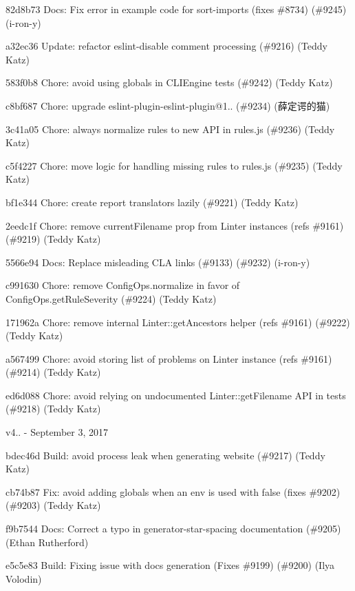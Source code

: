 \begin{DoxyItemize}
\item 82d8b73 Docs\+: Fix error in example code for sort-\/imports (fixes \#8734) (\#9245) (i-\/ron-\/y)
\item a32ec36 Update\+: refactor eslint-\/disable comment processing (\#9216) (Teddy Katz)
\item 583f0b8 Chore\+: avoid using globals in C\+L\+I\+Engine tests (\#9242) (Teddy Katz)
\item c8bf687 Chore\+: upgrade eslint-\/plugin-\/eslint-\/plugin@1.. (\#9234) (薛定谔的猫)
\item 3c41a05 Chore\+: always normalize rules to new A\+PI in rules.\+js (\#9236) (Teddy Katz)
\item c5f4227 Chore\+: move logic for handling missing rules to rules.\+js (\#9235) (Teddy Katz)
\item bf1e344 Chore\+: create report translators lazily (\#9221) (Teddy Katz)
\item 2eedc1f Chore\+: remove current\+Filename prop from Linter instances (refs \#9161) (\#9219) (Teddy Katz)
\item 5566e94 Docs\+: Replace misleading C\+LA links (\#9133) (\#9232) (i-\/ron-\/y)
\item c991630 Chore\+: remove Config\+Ops.\+normalize in favor of Config\+Ops.\+get\+Rule\+Severity (\#9224) (Teddy Katz)
\item 171962a Chore\+: remove internal Linter\+::get\+Ancestors helper (refs \#9161) (\#9222) (Teddy Katz)
\item a567499 Chore\+: avoid storing list of problems on Linter instance (refs \#9161) (\#9214) (Teddy Katz)
\item ed6d088 Chore\+: avoid relying on undocumented Linter\+::get\+Filename A\+PI in tests (\#9218) (Teddy Katz)
\end{DoxyItemize}

v4.. -\/ September 3, 2017


\begin{DoxyItemize}
\item bdec46d Build\+: avoid process leak when generating website (\#9217) (Teddy Katz)
\item cb74b87 Fix\+: avoid adding globals when an env is used with {\ttfamily false} (fixes \#9202) (\#9203) (Teddy Katz)
\item f9b7544 Docs\+: Correct a typo in generator-\/star-\/spacing documentation (\#9205) (Ethan Rutherford)
\item e5c5e83 Build\+: Fixing issue with docs generation (Fixes \#9199) (\#9200) (Ilya Volodin)
\end{DoxyItemize}

